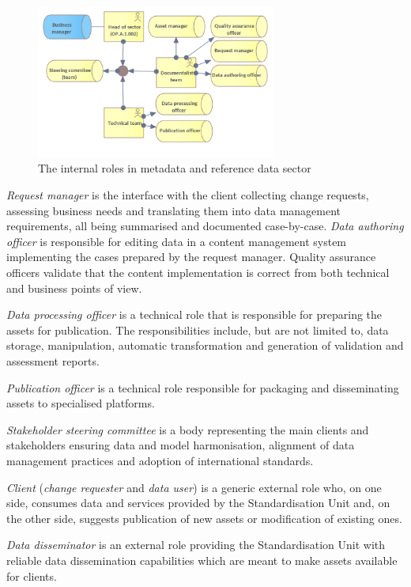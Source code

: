 	\begin{figure}[h]
		\centering
		\includegraphics[width=0.7\textwidth]{images/business/Internal Roles.png}
		\caption{The internal roles in metadata and reference data sector}
		\label{fig:internal-roles}
	\end{figure}
	
	\textit{Request manager} is the interface with the client collecting change requests, assessing business needs and translating them into data management requirements, all being summarised and documented case-by-case. 
	\textit{Data authoring officer} is responsible for editing data in a content management system implementing the cases prepared by the request manager.
	Quality assurance officers validate that the content implementation is correct from both technical and business points of view. 
	
	\textit{Data processing officer} is a technical role that is responsible for preparing the assets for publication. The responsibilities include, but are not limited to, data storage, manipulation, automatic transformation and generation of validation and assessment reports. 
	
	\textit{Publication officer} is a technical role responsible for packaging and disseminating assets to specialised platforms.
	
	\textit{Stakeholder steering committee} is a body representing the main clients and stakeholders ensuring data and model harmonisation, alignment of data management practices and adoption of international standards.
	
	\textit{Client} (\textit{change requester} and \textit{data user}) is a generic external role who, on one side, consumes data and services provided by the Standardisation Unit and, on the other side, suggests publication of new assets or modification of existing ones. 
	
	\textit{Data disseminator} is an external role providing the Standardisation Unit with reliable data dissemination capabilities which are meant to make assets available for clients.

